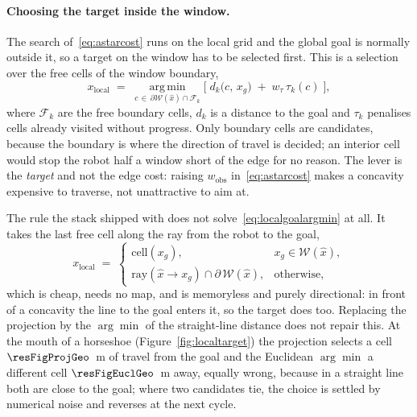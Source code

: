 \documentclass[11pt,a4paper]{article}
\begin{document}
\paragraph{Choosing the target inside the window.} The search of~\eqref{eq:astarcost} runs on the local
grid and the global goal is normally outside it, so a target on the window has to be selected first. This
is a selection over the free cells of the window boundary,
\begin{equation}
  x_{\mathrm{local}} \;=\;
  \operatorname*{arg\,min}_{c\,\in\,\partial\mathcal{W}(\hat x)\cap\mathcal{F}_k}
  \Big[\; d_k\big(c,\,x_g\big) \;+\; w_\tau\,\tau_k(c) \;\Big],
  \label{eq:localgoalargmin}
\end{equation}
where $\mathcal{F}_k$ are the free boundary cells, $d_k$ is a distance to the goal and $\tau_k$ penalises
cells already visited without progress. Only boundary cells are candidates, because the boundary is where
the direction of travel is decided; an interior cell would stop the robot half a window short of the edge
for no reason. The lever is the \emph{target} and not the edge cost: raising
$w_{\mathrm{obs}}$ in~\eqref{eq:astarcost} makes a concavity expensive to traverse, not unattractive to aim
at.

The rule the stack shipped with does not solve~\eqref{eq:localgoalargmin} at all. It takes the last free
cell along the ray from the robot to the goal,
\begin{equation}
  x_{\mathrm{local}} \;=\;
  \begin{cases}
    \mathrm{cell}(x_g), & x_g\in\mathcal{W}(\hat x),\\[2pt]
    \mathrm{ray}(\hat x\!\rightarrow\! x_g)\cap\partial\,\mathcal{W}(\hat x), & \text{otherwise},
  \end{cases}
  \label{eq:localgoal}
\end{equation}
which is cheap, needs no map, and is memoryless and purely directional: in front of a concavity the line
to the goal enters it, so the target does too. Replacing the projection by the $\arg\min$ of the
straight-line distance does not repair this. At the mouth of a horseshoe (Figure~\ref{fig:localtarget}) the
projection selects a cell $\resFigProjGeo$~m of travel from the goal and the Euclidean $\arg\min$ a
different cell $\resFigEuclGeo$~m away, equally wrong, because in a straight line both are close to the
goal; where two candidates tie, the choice is settled by numerical noise and reverses at the next cycle.
\end{document}
